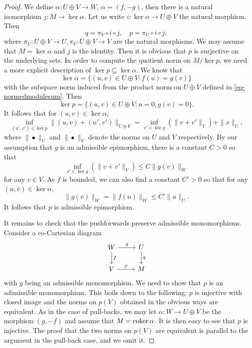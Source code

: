 \begin{proof}
    We define $\alpha:U\oplus V\rightarrow W$, $\alpha=(f,-g)$, then there is a natural isomorphism $j:M\rightarrow \ker \alpha$. Let us write $i:\ker \alpha\rightarrow U\oplus V$ the natural morphism. Then
    \[
        q=\pi_V\circ i \circ j,\quad p=\pi_U\circ i \circ j,  
    \]
    where $\pi_U:U\oplus V\rightarrow U,\pi_V:U\oplus V\rightarrow V$ are the natural morphisms. We may assume that $M=\ker \alpha$ and $j$ is the identity. Then it is obvious that $p$ is surjective on the underlying sets. In order to compute the quotient norm on  $M/\ker p$, we need a more explicit description of $\ker p\subseteq \ker \alpha$. We know that 
    \[
        \ker \alpha=\{(u,v)\in U\oplus V: f(u)=g(v)\}  
    \]
    with the subspace norm induced from the product norm on $U\oplus V$ defined in \eqref{eq-normedmodulesum}. Then
    \[
        \ker p=\{(u,v)\in U\oplus V:u=0, g(v)=0\}.    
    \]
    It follows that for $(u,v)\in \ker \alpha$,
    \[
        \inf_{(u',v')\in \ker p} \|(u,v)+(u',v')\|_{U\oplus V}=\inf_{v'\in \ker g} (\|v+v'\|_V)+ \|x\|_U,
    \]
    where $\|\bullet\|_U$ and $\|\bullet\|_V$ denote the norms on $U$ and $V$ respectively. By our assumption that $g$ is an admissible epimorphism, there is a constant $C>0$ so that 
    \[
        \inf_{v'\in \ker g} (\|v+v'\|_V)\leq C\|g(v)\|_W
    \]
    for any $v\in V$.
    As $f$ is bounded, we can also find a constant $C'>0$ so that for any $(u,v)\in \ker \alpha$, 
    \[
        \|g(v)\|_W=\|f(u)\|_W\leq C'\|u\|_U.
    \]
    It follows that $p$ is admissible epimorphism.

    It remains to check that the pushforwards preserve admissible monomorphisms. Consider a co-Cartesian diagram
    \[
        \begin{tikzcd}
            W \arrow[r, "g"] \arrow[d, "f"]  & U \arrow[d, "q"] \\
            V \arrow[r, "p"]                                               & M               
        \end{tikzcd}  
    \]
    with $g$ being an admissible monomorphism. We need to show that $p$ is an adimissible monomorphism. This boils down to the following: $p$ is injective with closed image and the norms on $p(V)$ obtained in the obvious ways are equivalent.
    As in the case of pull-backs, we may let $\alpha:W\rightarrow U\oplus V$ be the  morphism $(g,-f)$ and assume that $M=\operatorname{coker} \alpha$. It is then easy to see that $p$ is injective. The proof that the two norms on $p(V)$ are equivalent is parallel to the argument in the pull-back case, and we omit it.


\end{proof}

